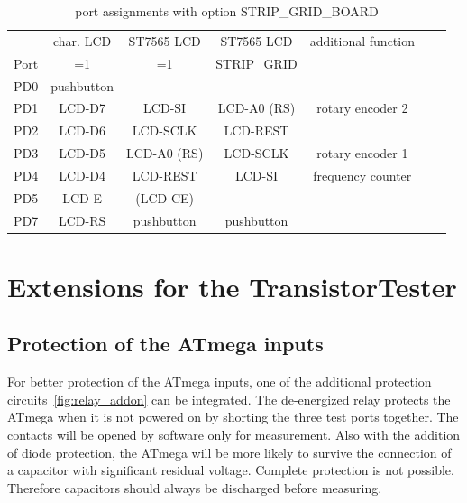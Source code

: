 \begin{table}[H]
  \begin{center}
    \begin{tabular}{| c || c | c | c | c | c | c |}
    \hline
           & char. LCD    & ST7565 LCD & ST7565 LCD    & additional function \\
      Port &   =1         &   =1       & STRIP\_GRID   & \\
    \hline
    \hline
    PD0    &  pushbutton  &              &             & \\
    \hline
    PD1    &  LCD-D7      &  LCD-SI      & LCD-A0 (RS) &  rotary encoder 2  \\
    \hline
    PD2    &  LCD-D6      &  LCD-SCLK    & LCD-REST    & \\
    \hline
    PD3    &  LCD-D5      &  LCD-A0 (RS) & LCD-SCLK    & rotary encoder 1 \\
    \hline
    PD4    &  LCD-D4      &  LCD-REST    & LCD-SI      & frequency counter \\
    \hline
    PD5    &  LCD-E       &  (LCD-CE)    &             & \\
    \hline
    PD7    &  LCD-RS      &  pushbutton  & pushbutton  & \\
    \hline
    \end{tabular}
  \end{center}
  \caption{port assignments with option STRIP\_GRID\_BOARD}
  \label{tab:grid-change}
\end{table}

\section {Extensions for the TransistorTester}

\subsection{Protection of the ATmega inputs}

For better protection of the ATmega inputs, one of the additional protection circuits~\ref{fig:relay_addon} 
can be integrated. The de-energized relay protects the ATmega when it is not powered on by shorting the
three test ports together.
The contacts will be opened by software only for measurement.
Also with the addition of diode protection, the ATmega will be more likely to survive the connection
of a capacitor with significant residual voltage.
Complete protection is not possible. Therefore capacitors should always be discharged before measuring.

